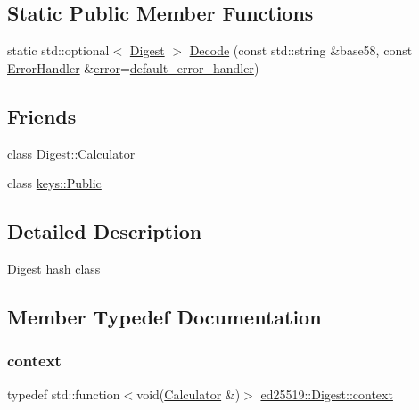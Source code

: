 \subsection*{Static Public Member Functions}
\begin{DoxyCompactItemize}
\item 
static std\+::optional$<$ \mbox{\hyperlink{classed25519_1_1_digest}{Digest}} $>$ \mbox{\hyperlink{classed25519_1_1_digest_a3e74ff17e4b4540bdca27cf1914a4641}{Decode}} (const std\+::string \&base58, const \mbox{\hyperlink{namespaceed25519_a6ba572942b3c18591fc869d52a6b16e6}{Error\+Handler}} \&\mbox{\hyperlink{namespaceed25519_ac93d0b5156eaca22197055e902920bc4}{error}}=\mbox{\hyperlink{namespaceed25519_a7c7bb6ed17541162959c33ed3e3b15fb}{default\+\_\+error\+\_\+handler}})
\end{DoxyCompactItemize}
\subsection*{Friends}
\begin{DoxyCompactItemize}
\item 
class \mbox{\hyperlink{classed25519_1_1_digest_a27f0effdfdf5c477d7471486da0e67a6}{Digest\+::\+Calculator}}
\item 
class \mbox{\hyperlink{classed25519_1_1_digest_aeb2790f4039920f65160ef1e580122be}{keys\+::\+Public}}
\end{DoxyCompactItemize}


\subsection{Detailed Description}
\mbox{\hyperlink{classed25519_1_1_digest}{Digest}} hash class 

\subsection{Member Typedef Documentation}
\mbox{\label{classed25519_1_1_digest_ae086cdedc0e704dd1d869138648b2d1a}} 
\subsubsection{\texorpdfstring{context}{context}}
{\footnotesize\ttfamily typedef std\+::function$<$void(\mbox{\hyperlink{structed25519_1_1_digest_1_1_calculator}{Calculator}} \&)$>$ \mbox{\hyperlink{classed25519_1_1_digest_ae086cdedc0e704dd1d869138648b2d1a}{ed25519\+::\+Digest\+::context}}}



